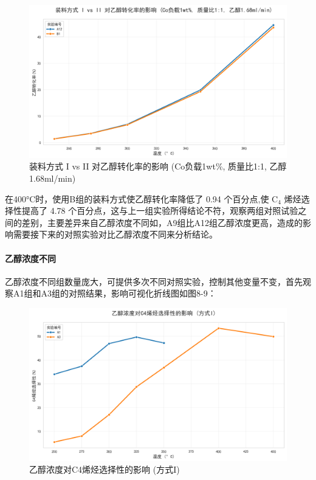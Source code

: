 \begin{figure}[h]%
	\centering%
	\includegraphics [scale=0.6]{图/2-1-1-2.png}
	\caption{装料方式 I vs II 对乙醇转化率的影响 (Co负载1wt\%, 质量比1:1, 乙醇1.68ml/min)} 
	\label{fig:1}
\end{figure}

在400°C时，使用B组的装料方式使乙醇转化率降低了 0.94 个百分点,使 \( \text{C}_4 \) 烯烃选择性提高了 4.78 个百分点，这与上一组实验所得结论不符，观察两组对照试验之间的差别，主要差异来自乙醇浓度不同如，A9组比A12组乙醇浓度更高，造成的影响需要接下来的对照实验对比乙醇浓度不同来分析结论。

\paragraph{乙醇浓度不同}
乙醇浓度不同组数量庞大，可提供多次不同对照实验，控制其他变量不变，首先观察A1组和A3组的对照结果，影响可视化折线图如图8-9：

\begin{figure}[h]%
	\centering%
	\includegraphics [scale=0.6]{图/2-2-1-1.png}
	\caption{乙醇浓度对C4烯烃选择性的影响 (方式I)} 
	\label{fig:1}
\end{figure}

